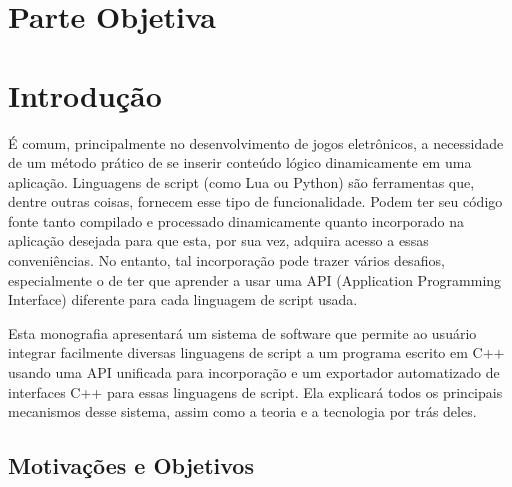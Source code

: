 \chapter*{Parte Objetiva}
\label{sec:parte_objetiva}
\chapter{Introdução}
\label{sec:intr}

É comum, principalmente no desenvolvimento de jogos eletrônicos, a necessidade
de um método prático de se inserir conteúdo lógico dinamicamente em uma
aplicação. Linguagens de script (como Lua ou Python) são ferramentas que, dentre
outras coisas, fornecem esse tipo de funcionalidade. Podem ter seu código fonte
tanto compilado e processado dinamicamente quanto incorporado na aplicação
desejada para que esta, por sua vez, adquira acesso a essas conveniências. No
entanto, tal incorporação pode trazer vários desafios, especialmente o de ter
que aprender a usar uma API (Application Programming Interface) diferente para
cada linguagem de script usada.

Esta monografia apresentará um sistema de software que permite ao usuário
integrar facilmente diversas linguagens de script a um programa escrito em C++
usando uma API unificada para incorporação e um exportador automatizado de
interfaces C++ para essas linguagens de script. Ela explicará todos os
principais mecanismos desse sistema, assim como a teoria e a tecnologia por trás
deles.

\section{Motivações e Objetivos}
\label{sec:intr:motivacoes_objetivos}

